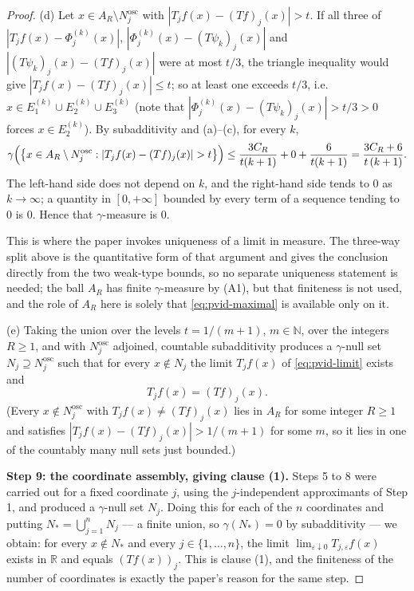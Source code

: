 \begin{proof}
(d) Let $x \in A_R \setminus N_j^{\mathrm{osc}}$ with
$|T_jf(x) - (Tf)_j(x)| > t$.  If all three of
$|T_jf(x) - \Phi^{(k)}_j(x)|$, $|\Phi^{(k)}_j(x) - (T\psi_k)_j(x)|$ and
$|(T\psi_k)_j(x) - (Tf)_j(x)|$ were at most $t/3$, the triangle inequality
would give $|T_jf(x) - (Tf)_j(x)| \leq t$; so at least one exceeds $t/3$, i.e.
$x \in E^{(k)}_1 \cup E^{(k)}_2 \cup E^{(k)}_3$ (note that
$|\Phi^{(k)}_j(x) - (T\psi_k)_j(x)| > t/3 > 0$ forces
$x \in E^{(k)}_2$).  By subadditivity and (a)--(c), for every $k$,
\[
  \gamma\Bigl(\bigl\{x \in A_R\setminus N_j^{\mathrm{osc}} :
      |T_jf(x) - (Tf)_j(x)| > t\bigr\}\Bigr)
    \leq \frac{3C_R}{t(k+1)} + 0 + \frac{6}{t(k+1)}
    = \frac{3C_R + 6}{t\,(k+1)} .
\]
The left-hand side does not depend on $k$, and the right-hand side tends to
$0$ as $k \to \infty$; a quantity in $[0,+\infty]$ bounded by every term of a
sequence tending to $0$ is $0$.  Hence that $\gamma$-measure is $0$.

This is where the paper invokes uniqueness of a limit in measure.  The
three-way split above is the quantitative form of that argument and gives the
conclusion directly from the two weak-type bounds, so no separate uniqueness
statement is needed; the ball $A_R$ has finite $\gamma$-measure by (A1), but
that finiteness is not used, and the role of $A_R$ here is solely that
\eqref{eq:pvid-maximal} is available only on it.

(e) Taking the union over the levels $t = 1/(m+1)$, $m \in \mathbb{N}$, over
the integers $R \geq 1$, and with $N_j^{\mathrm{osc}}$ adjoined, countable
subadditivity produces a $\gamma$-null set
$N_j \supseteq N_j^{\mathrm{osc}}$ such that for every $x \notin N_j$ the limit
$T_jf(x)$ of \eqref{eq:pvid-limit} exists and
\begin{equation}\label{eq:pvid-ident}
  T_jf(x) = (Tf)_j(x) .
\end{equation}
(Every $x \notin N_j^{\mathrm{osc}}$ with $T_jf(x) \neq (Tf)_j(x)$ lies in
$A_R$ for some integer $R \geq 1$ and satisfies
$|T_jf(x) - (Tf)_j(x)| > 1/(m+1)$ for some $m$, so it lies in one of the
countably many null sets just bounded.)

\medskip
\noindent\textbf{Step 9: the coordinate assembly, giving clause (1).}
Steps 5 to 8 were carried out for a fixed coordinate $j$, using the
$j$-independent approximants of Step 1, and produced a $\gamma$-null set
$N_j$.  Doing this for each of the $n$ coordinates and putting
$N_* = \bigcup_{j=1}^n N_j$ --- a finite union, so $\gamma(N_*) = 0$ by
subadditivity --- we obtain: for every $x \notin N_*$ and every
$j \in \{1,\ldots,n\}$, the limit
$\lim_{\varepsilon\downarrow0}T_{j,\varepsilon}f(x)$ exists in $\mathbb{R}$ and
equals $(Tf(x))_j$.  This is clause (1), and the finiteness of the number of
coordinates is exactly the paper's reason for the same step.


\end{proof}

